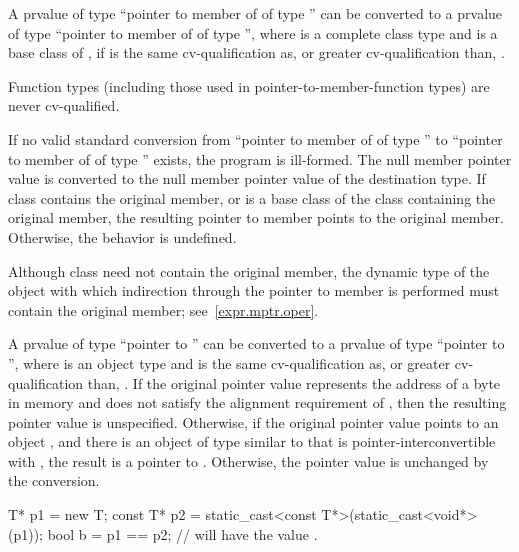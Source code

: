 \pnum
{}%
A prvalue of type ``pointer to member of  of type 
'' can be converted to a prvalue of type ``pointer to member of
 of type  '', where
 is a complete class type and
 is a base class of ,
if  is the same cv-qualification
as, or greater cv-qualification than, .
\begin{note}
Function types (including those used in pointer-to-member-function types)
are never cv-qualified.
\end{note}
If no valid standard conversion
from ``pointer to member of  of type ''
to ``pointer to member of  of type ''
exists, the program is ill-formed.
The null member pointer value is converted to the null
member pointer value of the destination type. If class 
contains the original member, or is a base class of the class
containing the original member, the resulting pointer to member points
to the original member. Otherwise, the behavior is undefined.
\begin{note}
Although class  need not contain the original member, the
dynamic type of the object with which indirection through the pointer
to member is performed must contain the original member;
see~\ref{expr.mptr.oper}.
\end{note}

\pnum
A prvalue of type ``pointer to  '' can be
converted to a prvalue of type ``pointer to  '',
where  is an object type and  is the same
cv-qualification as, or greater cv-qualification than, .
If the original pointer value represents the address
 of a byte in memory and
 does not satisfy the alignment requirement of ,
then the resulting pointer value is unspecified.
Otherwise, if the original pointer value points to an object ,
and there is an object  of type similar to 
that is pointer-interconvertible with ,
the result is a pointer to .
Otherwise, the pointer value is unchanged by the conversion.
\begin{example}
\begin{codeblock}
T* p1 = new T;
const T* p2 = static_cast<const T*>(static_cast<void*>(p1));
bool b = p1 == p2;  //  will have the value .
\end{codeblock}
\end{example}

